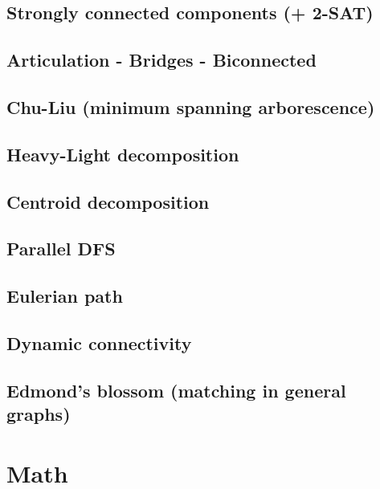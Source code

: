 \subsection{Strongly connected components (+ 2-SAT)}
\subsection{Articulation - Bridges - Biconnected}
\subsection{Chu-Liu (minimum spanning arborescence)}
\subsection{Heavy-Light decomposition}
\subsection{Centroid decomposition}
\subsection{Parallel DFS}
\subsection{Eulerian path}
\subsection{Dynamic connectivity}
\subsection{Edmond's blossom (matching in general graphs)}

\section{Math}
